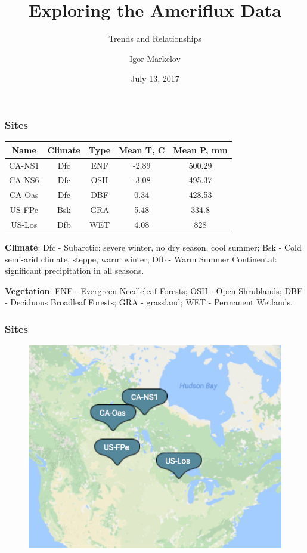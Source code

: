 \documentclass{beamer}
\title{Exploring the Ameriflux Data}
\subtitle{Trends and Relationships}
\author{Igor Markelov}
\institute{Upscaling Group Meeting}
\date{July 13, 2017}
\begin{document}
\begin{frame}
\titlepage
\end{frame}



\begin{frame}
\frametitle{Sites}

\begin{center}
\begin{tabular}{| c | c | c | c | c |}
\hline
Name & Climate & Type & Mean T, C & Mean P, mm \\ \hline
CA-NS1 & Dfc & ENF & -2.89 & 500.29 \\\hline
CA-NS6 & Dfc & OSH & -3.08 & 495.37 \\\hline
CA-Oas & Dfc & DBF & 0.34 & 428.53 \\\hline
US-FPe & Bsk & GRA & 5.48 & 334.8 \\\hline
US-Los &  Dfb& WET &   4.08 & 828\\\hline

\hline
\end{tabular}
\end{center}


\textbf{Climate}:
Dfc - Subarctic: severe winter, no dry season, cool summer;
Bsk - Cold semi-arid climate, steppe, warm winter;
Dfb - Warm Summer Continental: significant precipitation in all seasons.

\textbf{Vegetation}:
ENF - Evergreen Needleleaf Forests;
OSH - Open Shrublands;
DBF - Deciduous Broadleaf Forests;
GRA - grassland;
WET - Permanent Wetlands.


\end{frame}


\begin{frame}
\frametitle{Sites}
\begin{figure}
\includegraphics[width=\textwidth]{sites.png}
\end{figure}
\end{frame}
\end{document}
